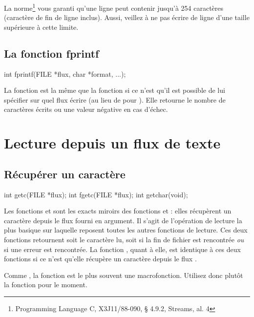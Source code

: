 \begin{attentionbox} 
 La norme\footnote{Programming Language
  C, X3J11/88-090, § 4.9.2, Streams, al. 4} vous garanti qu'une ligne peut
contenir jusqu'à 254 caractères (caractère de fin de ligne inclus).
Aussi, veillez à ne pas écrire de ligne d'une taille supérieure à cette
limite.
\end{attentionbox}


\subsection{La fonction fprintf}
\label{la-fonction-fprintf}

\begin{C}
int fprintf(FILE *flux, char *format, ...);
\end{C}

La fonction  est la même que la fonction
 si ce n'est qu'il est possible de lui spécifier sur
quel flux écrire (au lieu de  pour ).
Elle retourne le nombre de caractères écrits ou une valeur négative en
cas d'échec.

\section{Lecture depuis un flux de texte }
\label{lecture-depuis-un-flux-de-texte }

\subsection{Récupérer un caractère}
\label{recuperer-un-caractere}

\begin{C}
int getc(FILE *flux);
int fgetc(FILE *flux);
int getchar(void);
\end{C}

Les fonctions  et  sont les exacts
miroirs des fonctions  et  : elles
récupèrent un caractère depuis le flux fourni en argument. Il s'agit de
l'opération de lecture la plus basique sur laquelle reposent toutes les
autres fonctions de lecture. Ces deux fonctions retournent soit le
caractère lu, soit  si la fin de fichier est rencontrée
\emph{ou} si une erreur est rencontrée. La fonction ,
quant à elle, est identique à ces deux fonctions si ce n'est qu'elle
récupère un caractère depuis le flux .

\begin{infobox}
  Comme , la fonction
 est le plus souvent une macrofonction. Utilisez donc
plutôt la fonction  pour le moment.
\end{infobox}

